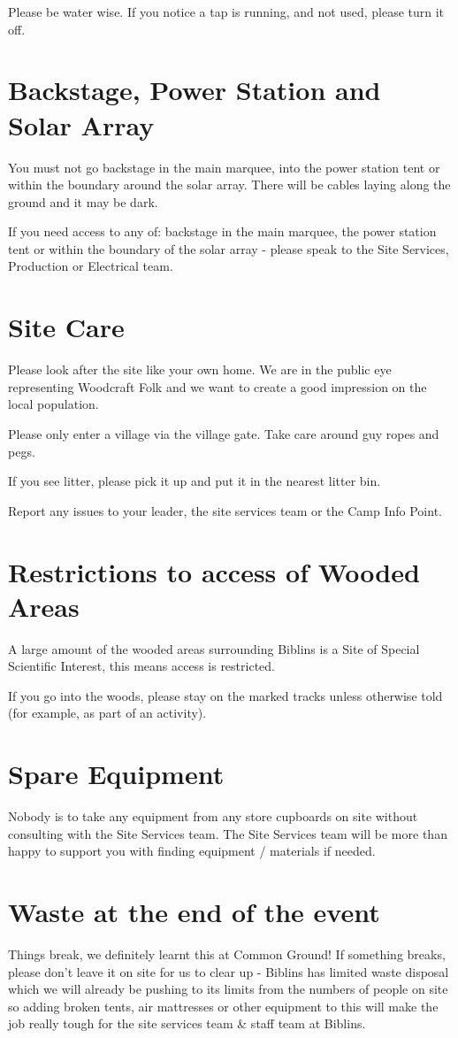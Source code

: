 \documentclass[a4paper, 11pt]{report}
\begin{document}
Please be water wise. If you notice a tap is running, and not used, please turn it off.

\section{Backstage, Power Station and Solar Array}
You must not go backstage in the main marquee, into the power station tent or within the boundary around the solar array. There will be cables laying along the ground and it may be dark.\nl

If you need access to any of: backstage in the main marquee, the power station tent or within the boundary of the solar array - please speak to the Site Services, Production or Electrical team.


\section{Site Care}
Please look after the site like your own home. We are in the public eye representing Woodcraft Folk and we want to create a good impression on the local population.\nl

Please only enter a village via the village gate. Take care around guy ropes and pegs. \nl


If you see litter, please pick it up and put it in the nearest litter bin.\nl

Report any issues to your leader, the site services team or the Camp Info Point.

\section{Restrictions to access of Wooded Areas}
A large amount of the wooded areas surrounding Biblins is a Site of Special Scientific Interest, this means access is restricted.\nl

If you go into the woods, please stay on the marked tracks unless otherwise told (for example, as part of an activity).

\section{Spare Equipment}
Nobody is to take any equipment from any store cupboards on site without consulting with the Site Services team. The Site Services team will be more than happy to support you with finding equipment / materials if needed.

\section{Waste at the end of the event}
Things break, we definitely learnt this at Common Ground! If something breaks, please don't leave it on site for us to clear up - Biblins has limited waste disposal which we will already be pushing to its limits from the numbers of people on site so adding broken tents, air mattresses or other equipment to this will make the job really tough for the site services team \& staff team at Biblins. 
\end{document}
